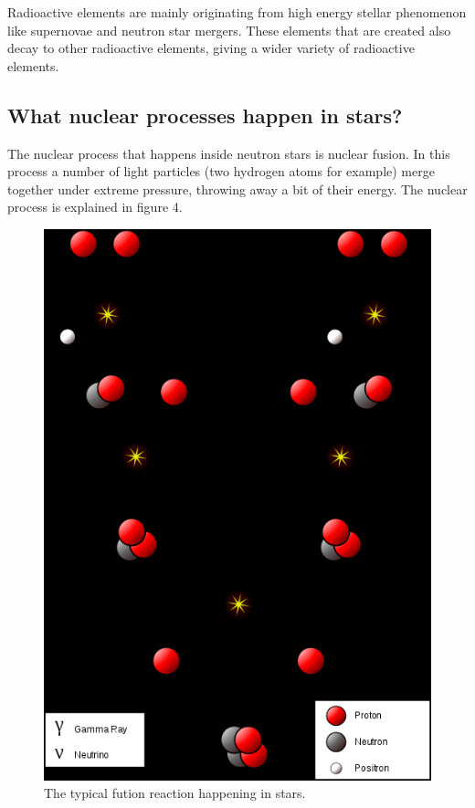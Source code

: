 \documentclass[]{article}
\begin{document}
Radioactive elements are mainly originating from high energy stellar phenomenon like supernovae and neutron star mergers. These elements that are created also decay to other radioactive elements, giving a wider variety of radioactive elements.

\subsection{What nuclear processes happen in stars?}

The nuclear process that happens inside neutron stars is nuclear fusion. In this process a number of light particles (two hydrogen atoms for example) merge together under extreme pressure, throwing away a bit of their energy. The nuclear process is explained in figure 4.

\begin{figure}
	\includegraphics[width=\linewidth]{fusion-reaction.png}
	\caption{The typical fution reaction happening in stars.}
	\label{fig:Fusion reaction}
\end{figure}
\end{document}
